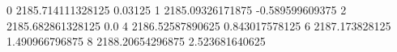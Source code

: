 0 2185.714111328125 0.03125
1 2185.09326171875 -0.589599609375
2 2185.682861328125 0.0
4 2186.52587890625 0.843017578125
6 2187.173828125 1.490966796875
8 2188.20654296875 2.523681640625
